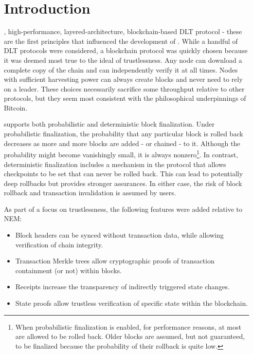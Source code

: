 \section{Introduction}
\label{sec:introduction}


, high-performance, layered-architecture, blockchain-based DLT protocol - these are the first principles that influenced the development of \codename.
While a handful of DLT protocols were considered, a blockchain protocol was quickly chosen because it was deemed most true to the ideal of trustlessness.
Any node can download a complete copy of the chain and can independently verify it at all times.
Nodes with sufficient harvesting power can always create blocks and never need to rely on a leader.
These choices necessarily sacrifice some throughput relative to other protocols, but they seem most consistent with the philosophical underpinnings of Bitcoin\cite{nakamoto2009}.

\codenamespace supports both probabilistic and deterministic block finalization.
Under probabilistic finalization, the probability that any particular block is rolled back decreases as more and more blocks are added - or chained - to it.
Although the probability might become vanishingly small, it is always nonzero\footnote{
	When probabilistic finalization is enabled, for performance reasons, at most  are allowed to be rolled back.
	Older blocks are assumed, but not guaranteed, to be finalized because the probability of their rollback is quite low.
}.
In contrast, deterministic finalization includes a mechanism in the protocol that allows checkpoints to be set that can never be rolled back.
This can lead to potentially deep rollbacks but provides stronger assurances.
In either case, the risk of block rollback and transaction invalidation is assumed by users.

As part of a focus on trustlessness, the following features were added relative to NEM:
\begin{itemize}
	\item{Block headers can be synced without transaction data, while allowing verification of chain integrity.}
	\item{Transaction Merkle trees allow cryptographic proofs of transaction containment (or not) within blocks.}
	\item{Receipts increase the transparency of indirectly triggered state changes.}
	\item{State proofs allow trustless verification of specific state within the blockchain.}
\end{itemize}

